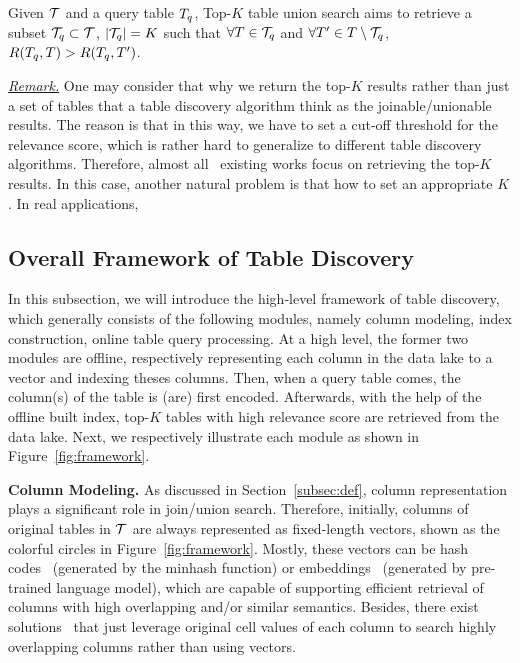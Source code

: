 \begin{definition}
	Given $\mathcal{T}$ and a query table $T_q$, Top-$K$ table union search aims to retrieve a subset $\mathcal{T}_q \subset \mathcal{T}$, $|\mathcal{T}_q|=K$ such that $\forall T \in \mathcal{T}_q$ and $\forall T' \in T \setminus \mathcal{T}_q$, $R(T_q, T)>R(T_q, T')$.
\end{definition}


\noindent \underline{\textit{Remark.}} One may consider that why we return the top-$K$ results rather than just  a set of  tables that a table discovery algorithm think as the joinable/unionable results.
The reason is that in this way, we have to set a cut-off threshold for the relevance score, which is rather hard to generalize to different table discovery algorithms. Therefore, almost all~\cite{} existing works focus on retrieving the top-$K$ results.  In this case, another natural problem is that how to set an appropriate $K$. In real applications, 

\subsection{Overall Framework of Table Discovery}

In this subsection, we will introduce the high-level framework of table discovery, which generally consists of the following modules, namely column modeling, index construction, online table query processing.
At a high level, the former two modules are offline, \ie respectively representing each column in the data lake to a vector and indexing theses columns. Then, when a query table comes, the column(s) of the table is (are) first encoded. Afterwards, with the help of the offline built index, top-$K$ tables with high relevance score are retrieved from the data lake. Next, we respectively illustrate each module as shown in Figure~\ref{fig:framework}.



\noindent\textbf{Column Modeling.}
As discussed in Section~\ref{subsec:def},  column representation plays a significant role in join/union search. Therefore,  initially,  columns of  original tables in $\mathcal{T}$ are always represented as fixed-length vectors, shown as the colorful circles in Figure~\ref{fig:framework}.
Mostly,  these vectors can be hash codes~\cite{} (\eg generated by the minhash function) or embeddings~\cite{} (\eg generated by pre-trained language model), which are capable of supporting efficient retrieval of columns with high overlapping and/or similar semantics. Besides, there exist solutions~\cite{} that just leverage original cell values of each column to search highly overlapping columns rather than using vectors. 

